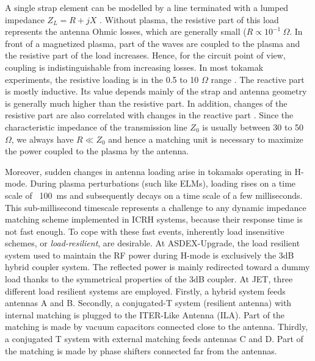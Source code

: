 A single strap element can be modelled by a line terminated with a lumped impedance $Z_L = R + j X$ . Without plasma, the resistive part of this load represents the antenna Ohmic losses, which are generally small ($R \propto 10^{-1}~\si{\Omega}$. In front of a magnetized plasma, part of the waves are coupled to the plasma and the resistive part of the load increases. Hence, for the circuit point of view, coupling is indistinguishable from increasing losses. In most tokamak experiments, the resistive loading is in the 0.5 to 10 $\si{\Omega}$ range . The reactive part is mostly inductive. Its value depends mainly of the strap and antenna geometry is generally much higher than the resistive part. In addition, changes of the resistive part are also correlated with changes in the reactive part \cite{pinsker1998}. Since the characteristic impedance of the transmission line $Z_0$ is usually between 30 to 50~$\si{\Omega}$, we always have $R \ll Z_0$ and hence a matching unit is necessary to maximize the power coupled to the plasma by the antenna.

Moreover, sudden changes in antenna loading arise in tokamaks operating in H-mode. During plasma perturbations (such like ELMs), loading rises on a time scale of ~100~ms and subsequently decays on a time scale of a few milliseconds. This sub-millisecond timescale represents a challenge to any dynamic impedance matching scheme implemented in ICRH systems, because their response time is not fast enough. To cope with these fast events, inherently load insensitive schemes, or \textit{load-resilient}, are desirable. At ASDEX-Upgrade, the load resilient system used to maintain the RF power during H-mode is exclusively the 3dB hybrid coupler system. The reflected power is mainly redirected toward a dummy load thanks to the symmetrical properties of the 3dB coupler. At JET, three different load resilient systems are employed. Firstly, a hybrid system feeds antennas A and B. Secondly, a conjugated-T system (resilient antenna) with internal matching is plugged to the ITER-Like Antenna (ILA). Part of the matching is made by vacuum capacitors connected close to the antenna. Thirdly, a conjugated T system with external matching feeds antennas C and D. Part of the matching is made by phase shifters connected far from the antennas.

